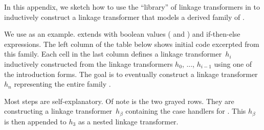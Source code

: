 In this appendix, we sketch how to use the ``library'' of linkage
transformers in \TT to inductively construct a linkage transformer that models a
derived family of .

We use  as an example.  extends
 with boolean values ( and )
and if-then-else expressions.
The left column of the table below shows initial code excerpted from
this family.
Each cell in the last column defines a linkage transformer~$h_i$
inductively constructed from the linkage transformers $h_0$, ..., $h_{i-1}$
using one of the introduction forms.
The goal is to eventually construct a linkage transformer $h_n$ representing
the entire family .

Most steps are self-explanatory.
Of note is the two grayed rows. They are constructing a linkage transformer~$h_\beta$
containing the case handlers for .
This $h_\beta$ is then appended to $h_3$ as a nested linkage transformer.

\medskip

